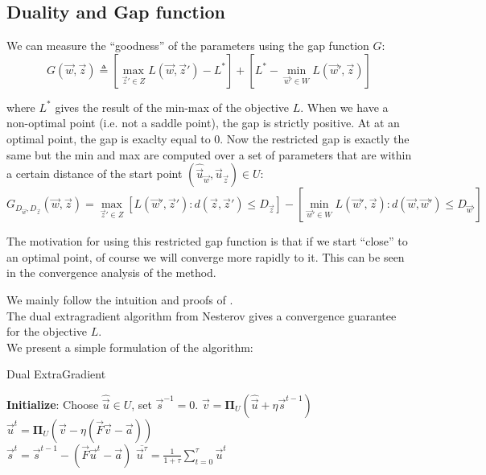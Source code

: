 \clearpage
\subsection{Duality and Gap function}
We can measure the ``goodness'' of the parameters using the gap function
${G}$:
\begin{equation}
  {G}(\vec w, \vec z) \triangleq \left[ \max_{\vec z' \in {Z}}
{L}(\vec w,\vec z') - {L}^* \right] + \left[ {L}^* -
\min_{\vec w' \in {W}} {L}(\vec w', \vec z) \right]
\end{equation}

where ${L}^*$ gives the result of the min-max of the objective
${L}$. When we have a non-optimal point (i.e. not a saddle point), the
gap is strictly positive. At at an optimal point, the gap is exaclty equal to 0.
Now the restricted gap is exactly the same but the min and max are computed over
a set of parameters that are within a certain distance of the start point
$(\hat{\vec u}_{\vec w},\hat{\vec u}_{\vec z}) \in {U}$:
\begin{equation}
  {G}_{D_{\vec w}, D_{\vec z}}(\vec w, \vec z) = \max_{\vec z' \in
{Z}} \left[ {L}(\vec w', \vec z') : d(\vec z, \vec z') \leq
D_{\vec z} \right] - \left [ \min_{\vec w' \in {W}} {L}(\vec w',
\vec z) : d(\vec w, \vec w') \leq D_{\vec w'} \right ]
\end{equation}

The motivation for using this restricted gap function is that if we start
``close'' to an optimal point, of course we will converge more rapidly to it.
This can be seen in the convergence analysis of the method.






We mainly follow the intuition and proofs of
\cite{taskarStructuredPredictionDual2006}.\\
The dual extragradient algorithm from Nesterov gives a convergence guarantee for
the objective ${L}$.\\
We present a simple formulation of the algorithm:
\begin{algorithm}
  \caption{Dual ExtraGradient}
  \label{alg:extra}
\begin{algorithmic}
  \STATE \textbf{Initialize}: Choose $\hat{\vec u} \in {U}$, set $\vec s^{-1} = 0$.
  \STATE $\vec v = \mathbf{\Pi}_{{U}}(\hat{\vec u} + \eta \vec s^{t-1})$\\
  \STATE $\vec u^t = \mathbf{\Pi}_{{U}}(\vec v - \eta (\vec F \vec v - \vec a))$\\
  \STATE $\vec s^t =  \vec s^{t-1} - (\vec F \vec u^t - \vec a)$
  \ENDFOR
  \RETURN $\overline{\vec u^{\tau}} = \frac{1}{1 + \tau} \sum_{t=0}^{\tau} \vec u^t$
\end{algorithmic}
\end{algorithm}

